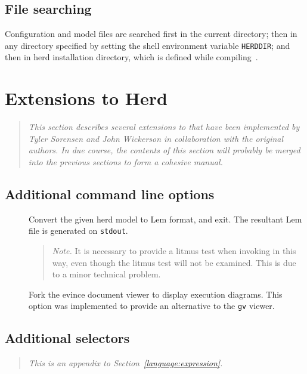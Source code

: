 \subsection{\label{herd:searchpath}File searching}
Configuration and model files are searched first in the current directory;
then in any directory specified
by setting the shell environment variable \texttt{HERDDIR};
and then in herd installation directory, which is defined
while compiling~\herd.

\section{Extensions to Herd}

\begin{quote}\it
This section describes several extensions to \herd{} that have been implemented by Tyler Sorensen and John Wickerson in collaboration with the original authors. In due course, the contents of this section will probably be merged into the previous sections to form a cohesive manual.
\end{quote}

\subsection{Additional command line options}

\begin{description}
\item[{\tt {}}] Convert the given herd model to Lem format, and exit. The resultant Lem file is generated on {\tt stdout}. 
\begin{quote}\emph{Note.} It is necessary to provide a litmus test when invoking \herd{} in this way, even though the litmus test will not be examined. This is due to a minor technical problem.\end{quote}
\item[{\tt {}}] Fork the evince document viewer to display execution diagrams. This option was implemented to provide an alternative to the {\tt gv} viewer.
\end{description}


\subsection{Additional selectors}

\begin{quote}\it
This is an appendix to Section~\ref{language:expression}.
\end{quote}

